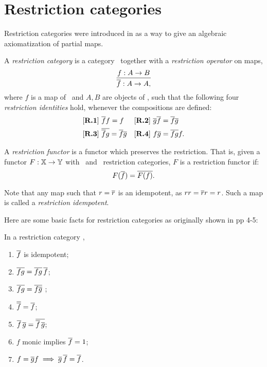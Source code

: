 \section{Restriction categories} %
\label{sec:restriction_categories}


Restriction categories were introduced in
 \cite{cockett2002:restcategories1} as a way to give an algebraic axiomatization of partial maps.
\begin{definition}\label{def:restriction_category}
  A \emph{restriction category} is a category \X\ together with a \emph{restriction operator} on
  maps,
  \[
    \infer{\restr{f}:A\to A,}{f:A \to B}
  \]
  where $f$ is a map of \X\ and $A,B$ are objects of \X, such that the
  following four \emph{restriction identities} hold, whenever the
  compositions are defined:
  \begin{align*}
    &[\text{\bfseries {R}.{1}}]\ \overline{f} f = f & &
    [\text{\bfseries {R}.{2}}]\ \overline{g}  \overline{f} = \overline{f}  \overline{g}\\
    &[\text{\bfseries {R}.{3}}]\ \overline{\overline{f}  g} = \overline{f}   \overline{g} & &
    [\text{\bfseries {R}.{4}}]\  f \overline{g} = \overline{f g} f.
  \end{align*}
\end{definition}

\begin{definition}
  A \emph{restriction functor} is a functor which preserves the restriction. That is,
  given a functor $F: \mathbb{X} \to \mathbb{Y}$ with \X\  and \Y\ restriction categories,
  $F$ is a restriction functor if:
  \[
    F(\overline{f}) = \overline{F(f)}.
  \]
\end{definition}

\begin{definition}\label{def:restriction_idempotent}
Note that any map such that $r=\overline{r}$ is an idempotent, as $r r = \overline{r} r = r$.
Such a map is called a \emph{restriction idempotent}.
\end{definition}

Here are some basic facts for restriction categories as originally
shown in \cite{cockett2002:restcategories1} pp 4-5:
\begin{lemma}\label{lem:restrictionvarious}
  In a restriction category \X,
  \begin{multicols}{2}
    \begin{enumerate}[{(}i{)}]
      \item{}$\overline{f}$ is idempotent;
      \item{} $\overline{f g} = \overline{f g} \, \overline{f}$;\label{lemitem:rv_2}
      \item{} $\overline{f g} = \overline{f \overline{g}}$ ;\label{lemitem:rv_3}
      \item{} $\overline{\overline{f}} = \overline{f}$;
      \item{} $\overline{f}\,\overline{g} = \overline{\overline{f}\,\overline{g}}$;
      \item{} $f$ monic implies $\overline{f} = 1$;
      \item{} $f = \overline{g} f \implies \overline{g}\,\overline{f} = \overline{f}$.
      \\
    \end{enumerate}
  \end{multicols}
\end{lemma}

